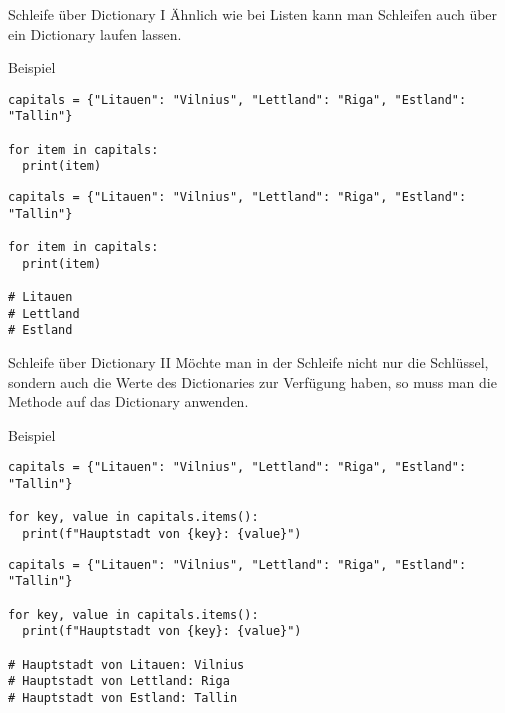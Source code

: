 \begin{fragile}

\begin{block}{Schleife über Dictionary I}
\vspace{2pt}
Ähnlich wie bei Listen kann man Schleifen auch über ein Dictionary laufen lassen.  
\end{block}
\vspace{12pt}
\pause 

\begin{exampleblock}{Beispiel}
\vspace{2pt}
\begin{overprint}
\begin{verbatim}
capitals = {"Litauen": "Vilnius", "Lettland": "Riga", "Estland": "Tallin"}

for item in capitals:
  print(item)
\end{verbatim}
\begin{verbatim}
capitals = {"Litauen": "Vilnius", "Lettland": "Riga", "Estland": "Tallin"}

for item in capitals:
  print(item)

# Litauen
# Lettland
# Estland
\end{verbatim}
\end{overprint}
\end{exampleblock}
\end{fragile}

\begin{fragile}
\begin{block}{Schleife über Dictionary II}
\vspace{2pt}
Möchte man in der Schleife nicht nur die Schlüssel, sondern auch die Werte des Dictionaries zur Verfügung haben, so muss man die Methode  auf das Dictionary anwenden.   
\end{block}
\vspace{12pt}
\pause 


\begin{exampleblock}{Beispiel}
\vspace{2pt}
\begin{overprint}
\begin{verbatim}
capitals = {"Litauen": "Vilnius", "Lettland": "Riga", "Estland": "Tallin"}

for key, value in capitals.items():
  print(f"Hauptstadt von {key}: {value}")
\end{verbatim}
\begin{verbatim}
capitals = {"Litauen": "Vilnius", "Lettland": "Riga", "Estland": "Tallin"}

for key, value in capitals.items():
  print(f"Hauptstadt von {key}: {value}")

# Hauptstadt von Litauen: Vilnius
# Hauptstadt von Lettland: Riga
# Hauptstadt von Estland: Tallin
\end{verbatim}
\end{overprint}
\end{exampleblock}
\end{fragile}

